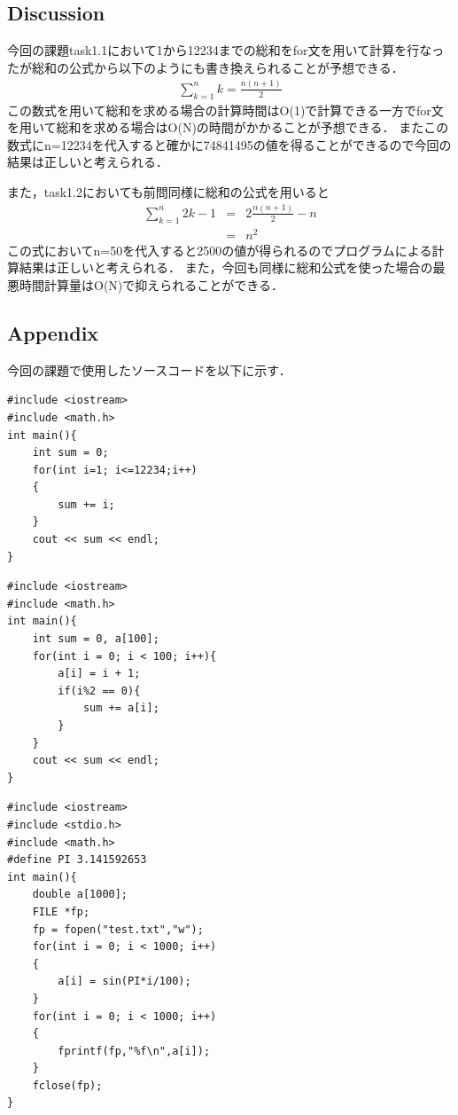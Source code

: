 \documentclass[11pt, a4paper,twocolumn]{jarticle}
\begin{document}
\subsection{Discussion}
今回の課題task1.1において1から12234までの総和をfor文を用いて計算を行なったが総和の公式から以下のようにも書き換えられることが予想できる．
\begin{eqnarray}
    \sum_{k=1}^{n} k = \frac{n(n+1)}{2} \nonumber
\end{eqnarray}
この数式を用いて総和を求める場合の計算時間はO(1)で計算できる一方でfor文を用いて総和を求める場合はO(N)の時間がかかることが予想できる．
またこの数式にn=12234を代入すると確かに74841495の値を得ることができるので今回の結果は正しいと考えられる．

また，task1.2においても前問同様に総和の公式を用いると
\begin{eqnarray}
    \sum_{k=1}^{n} 2k-1 & = & 2\frac{n(n+1)}{2} - n \nonumber \\
                        & = & n^2
\end{eqnarray}
この式においてn=50を代入すると2500の値が得られるのでプログラムによる計算結果は正しいと考えられる．
また，今回も同様に総和公式を使った場合の最悪時間計算量はO(N)で抑えられることができる．

\subsection{Appendix}
今回の課題で使用したソースコードを以下に示す．

\begin{lstlisting}[caption=task1.1,label=task1.1]
#include <iostream>
#include <math.h>
int main(){
    int sum = 0;
    for(int i=1; i<=12234;i++)
    {
        sum += i;
    }
    cout << sum << endl;
}
\end{lstlisting}

\begin{lstlisting}[caption=task1.2,label=task1.2]
#include <iostream>
#include <math.h>
int main(){
    int sum = 0, a[100];
    for(int i = 0; i < 100; i++){
        a[i] = i + 1;
        if(i%2 == 0){
            sum += a[i];
        }
    }
    cout << sum << endl;
}
\end{lstlisting}
\newpage
\begin{lstlisting}[caption=task1.3,label=task1.3]
#include <iostream>
#include <stdio.h>
#include <math.h>
#define PI 3.141592653
int main(){
    double a[1000];
    FILE *fp;
    fp = fopen("test.txt","w");
    for(int i = 0; i < 1000; i++)
    {
        a[i] = sin(PI*i/100);
    }
    for(int i = 0; i < 1000; i++)
    {
        fprintf(fp,"%f\n",a[i]);
    }
    fclose(fp);
}
\end{lstlisting}

\newpage
\end{document}
